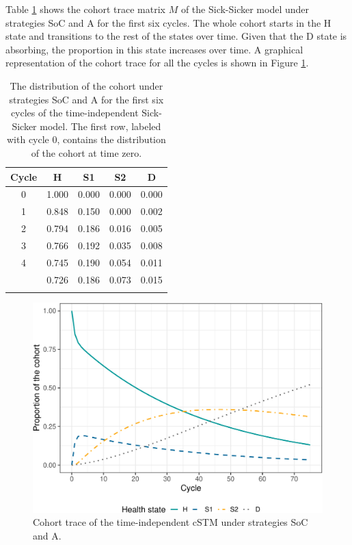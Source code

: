 \documentclass[
]{article}
\begin{document}
Table \ref{tab:Trace} shows the cohort trace matrix \(M\) of the Sick-Sicker model under strategies SoC and A for the first six cycles. The whole cohort starts in the H state and transitions to the rest of the states over time. Given that the D state is absorbing, the proportion in this state increases over time. A graphical representation of the cohort trace for all the cycles is shown in Figure \ref{fig:Sick-Sicker-Trace-TimeHom}.

\begin{table}[!h]

\caption{\label{tab:Trace}The distribution of the cohort under strategies SoC and A for the first six cycles of the time-independent Sick-Sicker model. The first row, labeled with cycle 0, contains the distribution of the cohort at time zero.}
\centering
\begin{tabular}[t]{ccccc}
\toprule{}
Cycle & H & S1 & S2 & D\\
\midrule{}
0 & 1.000 & 0.000 & 0.000 & 0.000\\
1 & 0.848 & 0.150 & 0.000 & 0.002\\
2 & 0.794 & 0.186 & 0.016 & 0.005\\
3 & 0.766 & 0.192 & 0.035 & 0.008\\
4 & 0.745 & 0.190 & 0.054 & 0.011\\
\addlinespace
5 & 0.726 & 0.186 & 0.073 & 0.015\\
\bottomrule{}
\end{tabular}
\end{table}

\begin{figure}[H]

{\centering \includegraphics{figs/Sick-Sicker-Trace-TimeHom-1} 

}

\caption{Cohort trace of the time-independent cSTM under strategies SoC and A.}\label{fig:Sick-Sicker-Trace-TimeHom}
\end{figure}
\end{document}
